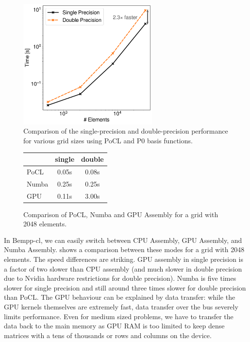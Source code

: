 \begin{figure}
	\center
	\includegraphics[width=7cm]{img/pocl_single_layer.pdf}
	\caption{Comparison of the single-precision and double-precision performance for various grid sizes using PoCL and P0 basis functions.}
	\label{fig:pocl_single_layer}
\end{figure}

\begin{figure}
\begin{center}
\begin{tabular}{l|c|c}
	        &   single      &    double\\
	        \hline
	 PoCL   &   0.05s       &    0.08s\\
	 Numba  &   0.25s       &    0.25s\\
	 GPU    &   0.11s       &    3.00s\\
\end{tabular}
\end{center}
\caption{Comparison of PoCL, Numba and GPU Assembly for a grid with 2048 elements.}
\label{fig:cpu_gpu_numba_compare}
\end{figure}
In Bempp-cl, we can easily switch between CPU Assembly, GPU Assembly, and Numba Assembly.  shows a comparison between these modes for a grid with 2048 elements. The speed differences are striking. GPU assembly in single precision is a factor of two slower than CPU assembly (and much slower in double precision due to Nvidia hardware restrictions for double precision). Numba is five times slower for single precision and still around three times slower for double precision than PoCL. The GPU behaviour can be explained by data transfer: while the GPU kernels themselves are extremely fast, data transfer over the bus severely limits performance. Even for medium sized problems, we have to transfer the data back to the main memory as GPU RAM is too limited to keep dense matrices with a tens of thousands or rows and columns on the device.

